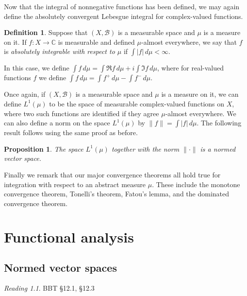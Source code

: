 \documentclass[11pt,oneside]{amsbook}
\newcommand{\CC}{{\mathbb C}}
\theoremstyle{definition}
\theoremstyle{plain}
\newtheorem{prop}[thm]{Proposition}
\theoremstyle{definition}
\newtheorem{defn}[thm]{Definition}
\theoremstyle{remark}
\newtheorem*{reading}{Reading}
\numberwithin{equation}{section}
\numberwithin{figure}{section}
\begin{document}
Now that the integral of nonnegative functions has been defined, we may again define the absolutely convergent Lebesgue integral for complex-valued functions.

\begin{defn}
  Suppose that $(X,\mathcal B)$ is a measurable space and $\mu$ is a measure on it. If $f\colon X\to\CC$ is measurable and defined $\mu$-almost everywhere, we say that $f$ is \emph{absolutely integrable with respect to $\mu$} if $\int|f|\,d\mu<\infty$.

  In this case, we define $\int f\,d\mu=\int\Re f\,d\mu+i\int\Im f\,d\mu$, where for real-valued functions $f$ we define $\int f\,d\mu=\int f^+\,d\mu-\int f^-\,d\mu$.
\end{defn}

Once again, if $(X,\mathcal B)$ is a measurable space and $\mu$ is a measure on it, we can define $L^1(\mu)$ to be the space of measurable complex-valued functions on $X$, where two such functions are identified if they agree $\mu$-almost everywhere. We can also define a norm on the space $L^1(\mu)$ by $\|f\|=\int|f|\,d\mu$. The following result follows using the same proof as before.

\begin{prop}
  The space $L^1(\mu)$ together with the norm $\|\cdot\|$ is a normed vector space.
\end{prop}

Finally we remark that our major convergence theorems all hold true for integration with respect to an abstract measure $\mu$. These include the monotone convergence theorem, Tonelli's theorem, Fatou's lemma, and the dominated convergence theorem.


\chapter{Functional analysis}

\section{Normed vector spaces}

\begin{reading}
  BBT \S 12.1, \S 12.3
\end{reading}
\end{document}
